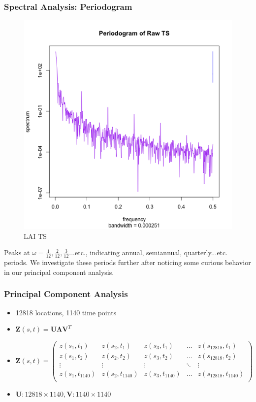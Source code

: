 \documentclass{beamer}
\begin{document}
\begin{frame}
\frametitle{Spectral Analysis: Periodogram}
\begin{figure}
\centering
\includegraphics[width=0.5\linewidth]{../img/RawSpec_LAI.png}
\caption{LAI TS}
\end{figure}
Peaks at $\omega=\frac{1}{12},\frac{2}{12}, \frac{3}{12}...$etc., indicating annual, semiannual, quarterly...etc. periods. We investigate these periods further after noticing some curious behavior in our principal component analysis.
\end{frame}

\begin{frame}
\frametitle{Principal Component Analysis}
\begin{itemize}
\item 12818 locations, 1140 time points
\item $\mathbf{Z}(s,t) = \mathbf{U}\mathbf{\Lambda}\mathbf{V}^T$  
\item $\mathbf{Z}(s,t)  = \begin{pmatrix}
z(s_1, t_1) & z(s_2, t_1) & z(s_3, t_1) & \dots & z(s_{12818}, t_1) \\
z(s_1, t_2) & z(s_2, t_2) & z(s_3, t_2) & \dots & z(s_{12818}, t_2) \\
\vdots & \vdots & \vdots & \ddots & \vdots\\
z(s_1, t_{1140}) & z(s_2, t_{1140}) & z(s_3, t_{1140}) & \dots & z(s_{12818}, t_{1140})\\ 
\end{pmatrix}$
\item $\mathbf{U} : 12818 \times 1140,  \mathbf{V} : 1140 \times 1140$
\end{itemize}
\end{frame}
\end{document}

